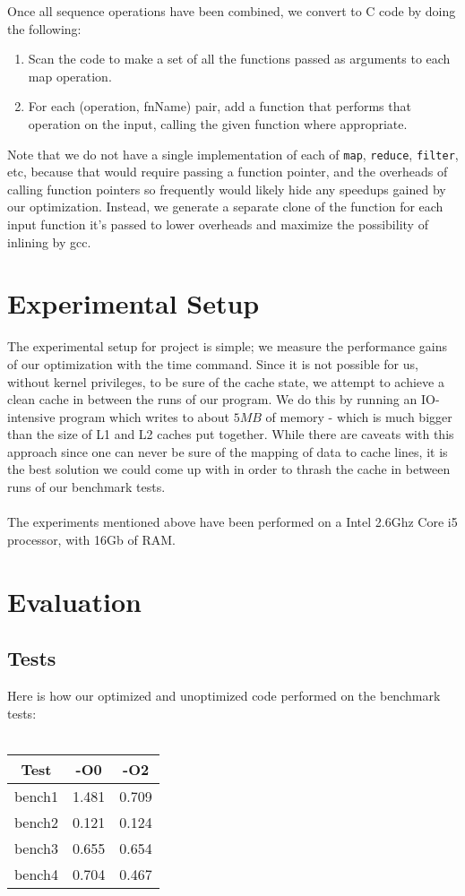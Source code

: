 \documentclass[a4paper,twocolumn]{article}
\newcommand{\sml}[1]{\texttt{#1}}
\begin{document}
\noindent
Once all sequence operations have been combined, we convert to C code by doing
the following:
\begin{enumerate}
\item Scan the code to make a set of all the functions passed as arguments to
  each map operation.
\item For each (operation, fnName) pair, add a function that performs that
  operation on the input, calling the given function where appropriate.
\end{enumerate}
\noindent
Note that we do not have a single implementation of each of \sml{map},
\sml{reduce}, \sml{filter}, etc, because that would require passing a function
pointer, and the overheads of calling function pointers so frequently would
likely hide any speedups gained by our optimization. Instead, we generate a
separate clone of the function for each input function it's passed to lower
overheads and maximize the possibility of inlining by gcc.



\section{Experimental Setup}
The experimental setup for project is simple; we measure the performance gains
of our optimization with the time command. Since it is not possible for us, without kernel
privileges, to be sure of the cache state, we attempt to achieve a clean cache
in between the runs of our program. We do this by running an IO-intensive
program which writes to about $5MB$ of memory - which is much bigger than the
size of L1 and L2 caches put together. While there are caveats with this approach
since one can never be sure of the mapping of data to cache lines, it is the
best solution we could come up with in order to thrash the cache in between
runs of our benchmark tests.
\\
\\ The experiments mentioned above have been performed on a Intel 2.6Ghz Core i5 processor, with 16Gb of RAM.
\section{Evaluation}

\subsection{Tests}
Here is how our optimized and unoptimized code performed on the benchmark tests:\\\\
\begin{tabular}{|c|c|c|}
\hline
Test		&	-O0		&	-O2\\
\hline
bench1	&	1.481	&	0.709\\
\hline
bench2	&	0.121	&	0.124\\
\hline
bench3	&	0.655	&	0.654\\
\hline
bench4	&	0.704	&	0.467\\
\hline
\end{tabular}\\
\end{document}
